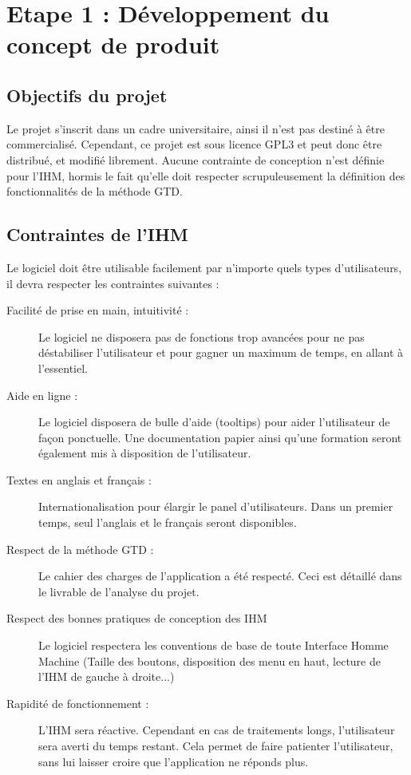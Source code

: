 \chapter{Etape 1 : Développement du concept de produit}


\section{Objectifs du projet}
Le projet s'inscrit dans un cadre universitaire, ainsi il n'est pas destiné à être commercialisé. Cependant, ce projet est sous licence GPL3 et peut donc être distribué, et modifié librement. Aucune contrainte de conception n'est définie pour l'IHM, hormis le fait qu'elle doit respecter scrupuleusement la définition des fonctionnalités de la méthode GTD.


\section{Contraintes de l'IHM}
Le logiciel doit être utilisable facilement par n'importe quels types d'utilisateurs, il devra respecter les contraintes suivantes : \\
\begin{description}
 \item[Facilité de prise en main, intuitivité :] Le logiciel ne disposera pas de fonctions trop avancées pour ne pas déstabiliser l'utilisateur et pour gagner un maximum de temps, en allant à l'essentiel.
 \item[Aide en ligne :] Le logiciel disposera de bulle d'aide (tooltips) pour aider l'utilisateur de façon ponctuelle. Une documentation papier ainsi qu'une formation seront également mis à disposition de l'utilisateur.
 \item[Textes en anglais et français :] Internationalisation pour élargir le panel d'utilisateurs. Dans un premier temps, seul l'anglais et le français seront disponibles.
 \item[Respect de la méthode GTD :] Le cahier des charges de l'application a été respecté. Ceci est détaillé dans le livrable de l'analyse du projet.
 \item[Respect des bonnes pratiques de conception des IHM] Le logiciel respectera les conventions de base de toute Interface Homme Machine (Taille des boutons, disposition des menu en haut, lecture de l'IHM de gauche à droite...)
 \item[Rapidité de fonctionnement :] L'IHM sera réactive. Cependant en cas de traitements longs, l'utilisateur sera averti du temps restant. Cela permet de faire patienter l'utilisateur, sans lui laisser croire que l'application ne réponds plus.
\end{description}


